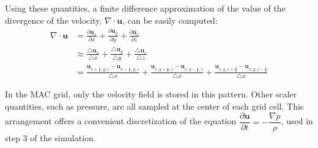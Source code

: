 \begin{figure}[]
    
    \label{mac cell 2}
\end{figure}

Using these quantities, a finite difference approximation of the value of the divergence of the velocity, $\nabla \cdot \textbf{u}$, can be easily computed:
\begin{equation}
    \begin{aligned}
        \nabla \cdot \textbf{u} 
        &=
        \frac{\partial \textbf{u}_x}{\partial x} +  
        \frac{\partial \textbf{u}_y}{\partial y} +
        \frac{\partial \textbf{u}_z}{\partial z} \\
        &\approx 
        \frac{\triangle \textbf{u}_x}{\triangle x} +  
        \frac{\triangle \textbf{u}_y}{\triangle y} +
        \frac{\triangle \textbf{u}_z}{\triangle z}\\
        &= 
        \frac{\textbf{u}_{x+\frac{1}{2},y,z} - \textbf{u}_{x-\frac{1}{2},y,z}}{\triangle x} +  
        \frac{\textbf{u}_{x,y+\frac{1}{2},z} - \textbf{u}_{x,y-\frac{1}{2},z}}{\triangle x} +
        \frac{\textbf{u}_{x,y,z+\frac{1}{2}} - \textbf{u}_{x,y,z-\frac{1}{2}}}{\triangle x}
    \end{aligned}
\end{equation}

In the MAC grid, only the velocity field is stored in this pattern. Other scaler quantities, such as pressure, are all sampled at the center of each grid cell. This arrangement offers a convenient discretization of the equation $\dfrac{\partial \textbf{u}}{\partial t}   = -\dfrac{\nabla p}{\rho}$, used in step 3 of the simulation.



